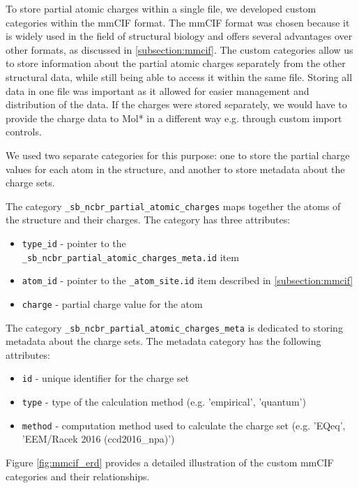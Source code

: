 \documentclass[
  digital,     %
  oneside,     %
  nosansbold,  %
  nocolorbold, %
  lof,         %
  lot,         %
]{fithesis4}
\begin{document}
To store partial atomic charges within a single file, we developed custom categories within the mmCIF format. The mmCIF format was chosen because it is widely used in the field of structural biology and offers several advantages over other formats, as discussed in \ref{subsection:mmcif}. The custom categories allow us to store information about the partial atomic charges separately from the other structural data, while still being able to access it within the same file. Storing all data in one file was important as it allowed for easier management and distribution of the data. If the charges were stored separately, we would have to provide the charge data to Mol* in a different way e.g. through custom import controls.


We used two separate categories for this purpose: one to store the partial charge values for each atom in the structure, and another to store metadata about the charge sets.

The category \texttt{\_sb\_ncbr\_partial\_atomic\_charges} maps together the atoms of the structure and their charges. The category has three attributes:

\begin{itemize}
  \item \texttt{type\_id} - pointer to the \\ \texttt{\_sb\_ncbr\_partial\_atomic\_charges\_meta.id} item
  \item \texttt{atom\_id} - pointer to the \texttt{\_atom\_site.id} item described in \ref{subsection:mmcif}
  \item \texttt{charge} - partial charge value for the atom
\end{itemize}

The category \texttt{\_sb\_ncbr\_partial\_atomic\_charges\_meta} is dedicated to storing metadata about the charge sets. The metadata category has the following attributes:

\begin{itemize}
  \item \texttt{id} - unique identifier for the charge set
  \item \texttt{type} - type of the calculation method (e.g. 'empirical', 'quantum')
  \item \texttt{method} - computation method used to calculate the charge set (e.g. 'EQeq', 'EEM/Racek 2016 (ccd2016\_npa)')
\end{itemize}

Figure \ref{fig:mmcif_erd} provides a detailed illustration of the custom mmCIF categories and their relationships.
\end{document}
